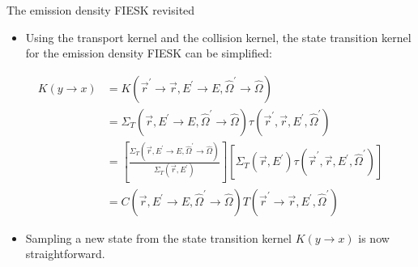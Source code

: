\documentclass{beamer}
\begin{document}
\begin{frame}{The emission density FIESK revisited}

  \begin{itemize}
    \item Using the transport kernel and the collision kernel, the state
      transition kernel for the emission density FIESK can be simplified:
  \end{itemize}

  \begin{align}
    K(y \to x) & = K(\vec{r}^{'} \to \vec{r}, E^{'} \to E, 
    \hat{\Omega}^{'} \to \hat{\Omega}) \nonumber \\
    & = \Sigma_T(\vec{r},E^{'} \to E, \hat{\Omega}^{'} \to \hat{\Omega})
    \tau(\vec{r}^{'},\vec{r},E^{'},\hat{\Omega}^{'}) \nonumber \\
    & = \left[
      \frac{\Sigma_T(\vec{r},E^{'} \to E, \hat{\Omega}^{'} \to \hat{\Omega})}
    {\Sigma_T(\vec{r},E^{'})} \right]\left[\Sigma_T(\vec{r},E^{'}) 
    \tau(\vec{r}^{'},\vec{r},E^{'},\hat{\Omega}^{'})\right] \nonumber \\
    & = C(\vec{r},E^{'} \to E,\hat{\Omega}^{'} \to \hat{\Omega})
    T(\vec{r}^{'} \to \vec{r},E^{'},\hat{\Omega}^{'}) \nonumber
  \end{align}

  \begin{itemize}
    \item Sampling a new state from the state transition kernel $K(y \to x)$
      is now straightforward.
  \end{itemize}

\end{frame}
\end{document}
